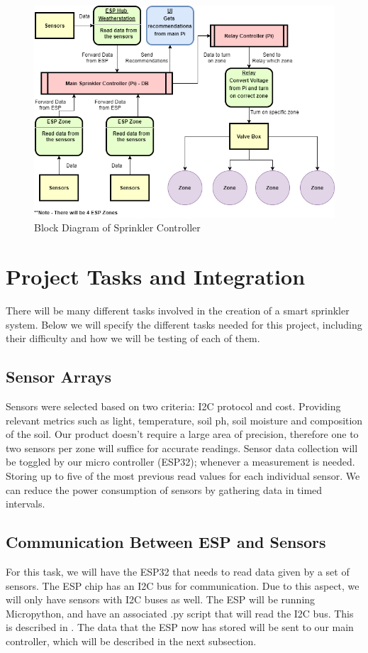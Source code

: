 \documentclass[letterpaper, 10 pt, conference]{ieeeconf}  %
\begin{document}
\begin{figure}
	\centering
	\includegraphics[width=\textwidth]{Diagram.png}
	\caption{Block Diagram of Sprinkler Controller}
	\label{label1}
\end{figure}


\section{Project Tasks and Integration}
There will be many different tasks involved in the creation of a smart sprinkler system. Below we will specify the different tasks needed for this project, including their difficulty and how we will be testing of each of them.

\subsection{Sensor Arrays}
Sensors were selected based on two criteria: I2C protocol and cost. Providing relevant metrics such as light, temperature, soil ph, soil moisture and composition of the soil. Our product doesn't require a large area of precision, therefore one to two sensors per zone will suffice for accurate readings. Sensor data collection will be toggled by our micro controller (ESP32); whenever a measurement is needed. Storing up to five of the most previous read values for each individual sensor. We can reduce the power consumption of sensors by gathering data in timed intervals.

\subsection{Communication Between ESP and Sensors}
For this task, we will have the ESP32 that needs to read data given by a set of sensors. The ESP chip has an I2C bus for communication. Due to this aspect, we will only have sensors with I2C buses as well. The ESP will be running Micropython, and have an associated .py script that will read the I2C bus. This is described in \cite{LowCostBLE}. The data that the ESP now has stored will be sent to our main controller, which will be described in the next subsection.
\end{document}
